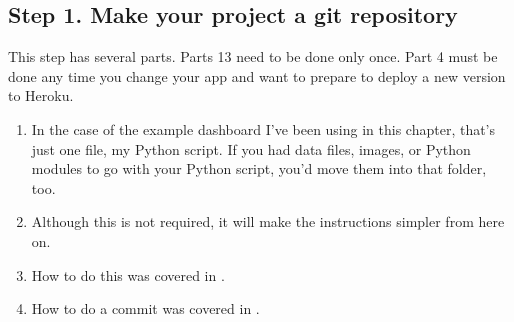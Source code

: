 \documentclass[letterpaper,10pt,english]{sphinxmanual}
\begin{document}
\subsection{Step 1. Make your project a git repository}
\label{\detokenize{chapter-14-dashboards:step-1-make-your-project-a-git-repository}}
This step has several parts.  Parts 1\sphinxhyphen{}3 need to be done only once.  Part 4 must be done any time you change your app and want to prepare to deploy a new version to Heroku.
\begin{enumerate}
%
\item {} 
  In the case of the example dashboard I’ve been using in this chapter, that’s just one file, my Python script.  If you had data files, images, or Python modules to go with your Python script, you’d move them into that folder, too.

\item {} 
  Although this is not required, it will make the instructions simpler from here on.

\item {} 
  How to do this was covered in .

\item {} 
  How to do a commit was covered in .

\end{enumerate}
\end{document}
